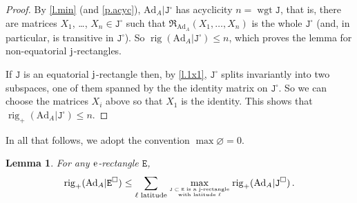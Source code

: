\documentclass[10pt, a4paper]{amsart}
\theoremstyle{plain}
\newtheorem{lemma}{Lemma}[section]
\theoremstyle{definition}
\theoremstyle{remark}
\theoremstyle{note}
\numberwithin{equation}{section}
\begin{document}
\begin{proof}
By \cref{l.min} (and \cref{p.acyc}), 
${\mathrm{Ad}}_A|{\mathtt{J}}^\square$ has acyclicity $n = \operatorname{wgt} {\mathtt{J}}$,
that is, there are matrices $X_1$, \dots, $X_n \in {\mathtt{J}}^\square$ 
such that 
${\mathfrak{R}}_{{\mathrm{Ad}}_A}(X_1, \dots, X_n)$ is the whole ${\mathtt{J}}^\square$
(and, in particular, is transitive in ${\mathtt{J}}^\square$).
So $\operatorname{rig} ({\mathrm{Ad}}_A|{\mathtt{J}}^\square) \le n$,
which proves the lemma for non-equatorial $\rm j$-rectangles.

If ${\mathtt{J}}$ is an equatorial $\rm j$-rectangle then, 
by \cref{l.1x1}, ${\mathtt{J}}^\square$ splits invariantly into two subspaces, one
of them spanned by the the identity matrix on ${\mathtt{J}}^\square$.
So we can choose the matrices $X_i$ above so that $X_1$ is the identity.
This shows that $\operatorname{rig}_+ ({\mathrm{Ad}}_A|{\mathtt{J}}^\square) \le n$.
\end{proof}

In all that follows, we adopt the convention $\max {\varnothing} = 0$.

\begin{lemma}\label{l.rig city} 
For any $\rm e$-rectangle ${\mathtt{E}}$,
$$
\operatorname{rig}_+ ({\mathrm{Ad}}_A | {\mathtt{E}}^\square) \le
\sum_{\text{\rm{$\ell$ latitude}}} 
\max_{\text{\rm{${\mathtt{J}} \subset {\mathtt{E}}$ is a $\rm j$-rectangle}} \atop \text{\rm{with latitude $\ell$}}}
\operatorname{rig}_+ ({\mathrm{Ad}}_A | {\mathtt{J}}^\square) \, .
$$
\end{lemma}
\end{document}
